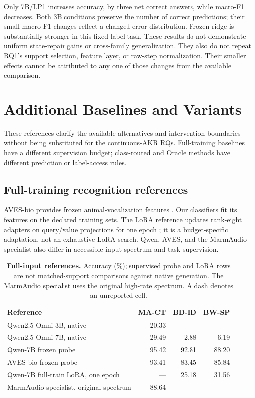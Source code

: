 \documentclass{article}
\begin{document}
Only 7B/LP1 increases accuracy, by three net correct answers, while macro-F1 decreases. Both 3B conditions preserve the number of correct predictions; their small macro-F1 changes reflect a changed error distribution. Frozen ridge is substantially stronger in this fixed-label task. These results do not demonstrate uniform state-repair gains or cross-family generalization. They also do not repeat RQ1's support selection, feature layer, or raw-step normalization. Their smaller effects cannot be attributed to any one of those changes from the available comparison.

\clearpage
\section{Additional Baselines and Variants}
\label{app:variants}
These references clarify the available alternatives and intervention boundaries without being substituted for the continuous-AKR RQs. Full-training baselines have a different supervision budget; class-routed and Oracle methods have different prediction or label-access rules.

\subsection{Full-training recognition references}
AVES-bio provides frozen animal-vocalization features \citep{hagiwara2022aves}. Our classifiers fit its features on the declared training sets. The LoRA reference updates rank-eight adapters on query/value projections for one epoch \citep{hu2022lora}; it is a budget-specific adaptation, not an exhaustive LoRA search. Qwen, AVES, and the MarmAudio specialist also differ in accessible input spectrum and task supervision.

\begin{table}[htbp]
\caption{\textbf{Full-input references.} Accuracy (\%); supervised probe and LoRA rows are not matched-support comparisons against native generation. The MarmAudio specialist uses the original high-rate spectrum. A dash denotes an unreported cell.}
\label{tab:references}
\centering\small
\begin{tabular}{@{}L{7.6cm}rrr@{}}
\toprule
Reference & MA-CT & BD-ID & BW-SP \\
\midrule
Qwen2.5-Omni-3B, native & 20.33 & --- & --- \\
Qwen2.5-Omni-7B, native & 29.49 & 2.88 & 6.19 \\
Qwen-7B frozen probe & 95.42 & 92.81 & 88.20 \\
AVES-bio frozen probe \citep{hagiwara2022aves} & 93.41 & 83.45 & 85.84 \\
Qwen-7B full-train LoRA, one epoch \citep{hu2022lora} & --- & 25.18 & 31.56 \\
MarmAudio specialist, original spectrum \citep{lamothe2025marmaudio} & 88.64 & --- & --- \\
\bottomrule
\end{tabular}
\end{table}
\end{document}
